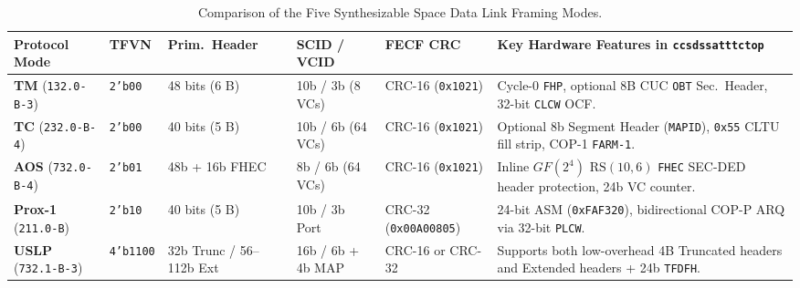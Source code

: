 \documentclass[10pt,a4paper]{article}
\renewcommand{\_}{\origunderscore\penalty0\hskip0pt\relax}
\numberwithin{table}{section}
\numberwithin{figure}{section}
\numberwithin{equation}{section}
\begin{document}
\begin{table}[htbp]
\centering
\scriptsize
\renewcommand{\arraystretch}{1.15}
\begin{tabularx}{\textwidth}{@{}L{0.85in}C{0.48in}C{0.72in}C{0.62in}C{0.78in}Y@{}}
\toprule
\textbf{Protocol Mode} & \textbf{TFVN} & \textbf{Prim.\ Header} & \textbf{SCID / VCID} & \textbf{FECF CRC} & \textbf{Key Hardware Features in \texttt{ccsds\_sat\_ttc\_top}} \\
\midrule
\textbf{TM} (\texttt{132.0-B-3}) & \texttt{2'b00} & 48 bits (6 B) & 10b / 3b (8 VCs) & CRC-16 (\texttt{0x1021}) & Cycle-0 \texttt{FHP}, optional 8B CUC \texttt{OBT} Sec.\ Header, 32-bit \texttt{CLCW} OCF. \\
\textbf{TC} (\texttt{232.0-B-4}) & \texttt{2'b00} & 40 bits (5 B) & 10b / 6b (64 VCs) & CRC-16 (\texttt{0x1021}) & Optional 8b Segment Header (\texttt{MAP\_ID}), \texttt{0x55} CLTU fill strip, COP-1 \texttt{FARM-1}. \\
\textbf{AOS} (\texttt{732.0-B-4}) & \texttt{2'b01} & 48b + 16b FHEC & 8b / 6b (64 VCs) & CRC-16 (\texttt{0x1021}) & Inline $GF(2^4)$ $\text{RS}(10,6)$ \texttt{FHEC} SEC-DED header protection, 24b VC counter. \\
\textbf{Prox-1} (\texttt{211.0-B}) & \texttt{2'b10} & 40 bits (5 B) & 10b / 3b Port & CRC-32 (\texttt{0x00A00805}) & 24-bit ASM (\texttt{0xFAF320}), bidirectional COP-P ARQ via 32-bit \texttt{PLCW}. \\
\textbf{USLP} (\texttt{732.1-B-3}) & \texttt{4'b1100} & 32b Trunc / 56--112b Ext & 16b / 6b + 4b MAP & CRC-16 or CRC-32 & Supports both low-overhead 4B Truncated headers and Extended headers + 24b \texttt{TFDFH}. \\
\bottomrule
\end{tabularx}
\caption{\footnotesize Comparison of the Five Synthesizable Space Data Link Framing Modes.}
\end{table}
\end{document}
